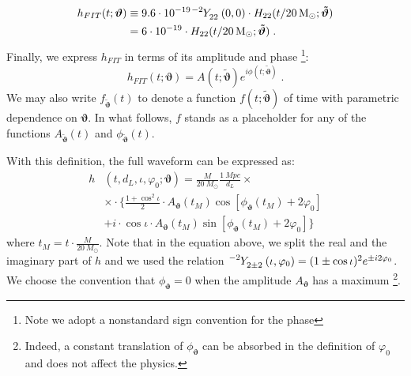 \begin{align}  
	h_{FIT}(t; \boldsymbol{\vartheta}) &\equiv 9.6 \cdot 10^{-19} \tensor[^{-2}]{Y}{_{2 2}}(0,0) \cdot H_{22}(t/\SI{20}{M_\odot}; \boldsymbol{\tilde{\vartheta}})  \nonumber \\
	&= 6 \cdot 10^{-19} \cdot H_{22}(t/\SI{20}{M_\odot}; \boldsymbol{\tilde{\vartheta}}) \label{eq:h_std} \; .
\end{align}
Finally, we express  $h_{FIT}$ in terms of its amplitude and phase
\footnote{Note we adopt a nonstandard sign convention for the phase}:
\begin{equation} \label{eq:h_ML}
	h_{FIT}(t; \boldsymbol{\vartheta}) = A(t; \boldsymbol{\tilde{\vartheta}}) e^{i \phi(t; \boldsymbol{\tilde{\vartheta}})} \; . 
\end{equation}
We may also write $f_{\boldsymbol{\tilde{\vartheta}}}(t)$ to denote a function $f(t;\boldsymbol{\tilde{\vartheta}})$ of time with parametric dependence on $\boldsymbol{\vartheta}$.
In what follows, $f$ stands as a placeholder for any of the functions $A_{\tilde{\boldsymbol{\vartheta}}}(t)$ and ${\phi}_{\tilde{\boldsymbol{\vartheta}}}(t)$.
\par
With this definition, the full waveform can be expressed as:
\begin{align} 
	h&(t, d_L,\iota,\varphi_0; \boldsymbol{\vartheta}) = \frac{M}{\SI{20}{M_\odot}} \frac{\SI{1}{Mpc}}{d_L} \times  \nonumber \\
		&\times \cdot \Bigg\{ \frac{1+\cos^2\iota}{2} \cdot A_{\boldsymbol{\vartheta}}(t_M)  \cos[\phi_{\boldsymbol{\vartheta}}(t_M)+2\varphi_0]  \nonumber \\
		&+ i \cdot \cos\iota \cdot A_{\boldsymbol{\vartheta}}(t_M)
 \sin[\phi_{\boldsymbol{\vartheta}}(t_M)+2\varphi_0] \Bigg\}
\label{eq:h_parametrization_simple}
\end{align}
where $t_M = t \cdot \frac{M}{\SI{20}{M_\odot}}$.
Note that in the equation above, we split the real and the imaginary part of $h$ and we used the relation ${\tensor[^{-2}]{Y}{_{2 \pm 2}}(\iota, \varphi_0) = (1 \pm \cos \iota)^2 e^{\pm i 2 \varphi_0}}$.
We choose the convention that $\phi_{\boldsymbol{\vartheta}} = 0$ when the amplitude $A_{\boldsymbol{\vartheta}}$ has a maximum
\footnote{Indeed, a constant translation of $\phi_{\boldsymbol{\vartheta}}$ can be absorbed in the definition of $\varphi_0$ and does not affect the physics.}.
\par
{}

